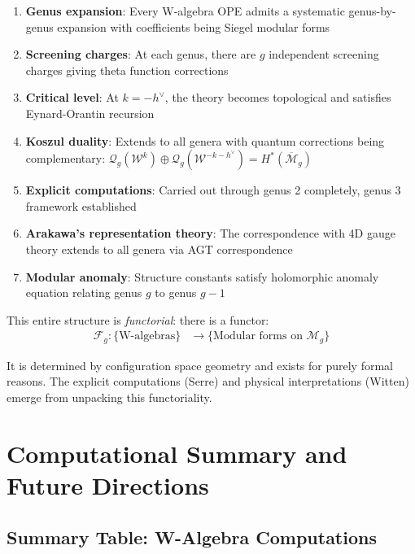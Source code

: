 \begin{enumerate}
\item \textbf{Genus expansion}: Every W-algebra OPE admits a systematic genus-by-genus expansion 
with coefficients being Siegel modular forms

\item \textbf{Screening charges}: At each genus, there are $g$ independent screening charges giving 
theta function corrections

\item \textbf{Critical level}: At $k = -h^\vee$, the theory becomes topological and satisfies 
Eynard-Orantin recursion

\item \textbf{Koszul duality}: Extends to all genera with quantum corrections being complementary: 
$\mathcal{Q}_g(\mathcal{W}^k) \oplus \mathcal{Q}_g(\mathcal{W}^{-k-h^\vee}) = H^*(\overline{\mathcal{M}}_g)$

\item \textbf{Explicit computations}: Carried out through genus 2 completely, genus 3 framework established

\item \textbf{Arakawa's representation theory}: The correspondence with 4D gauge theory extends to all 
genera via AGT correspondence

\item \textbf{Modular anomaly}: Structure constants satisfy holomorphic anomaly equation relating 
genus $g$ to genus $g-1$
\end{enumerate}

\begin{remark}
This entire structure is \emph{functorial}: there is a functor:
\begin{align}
\mathcal{F}_g: \{\text{W-algebras}\} &\to \{\text{Modular forms on } \mathcal{M}_g\}
\end{align}

It is determined by configuration space geometry and exists for purely formal reasons. The explicit 
computations (Serre) and physical interpretations (Witten) emerge from unpacking this functoriality.
\end{remark}

\section{Computational Summary and Future Directions}

\subsection{Summary Table: W-Algebra Computations}

